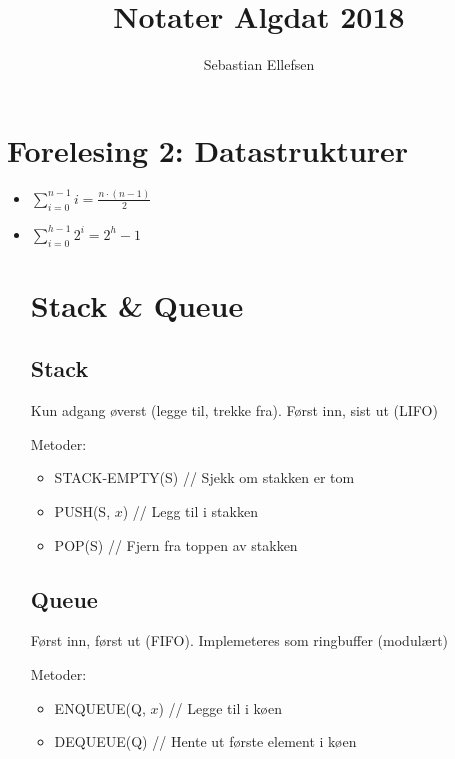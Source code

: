 \documentclass{article}
\title{Notater Algdat 2018}
\author{Sebastian Ellefsen}
\begin{document}
	\maketitle
	
	\section{Forelesing 2: Datastrukturer}
	
		\begin{itemize}
			\item $\sum_{i=0}^{n-1}i = \frac{n \cdot (n-1)}{2}$
			\item $\sum_{i=0}^{h-1} 2^i = 2^h - 1$
			
			\section{Stack \& Queue}
				\subsection{Stack}
					Kun adgang øverst (legge til, trekke fra).
					Først inn, sist ut (LIFO)
					
					Metoder: 
					\begin{itemize}
						\item STACK-EMPTY(S) // Sjekk om stakken er tom
						\item PUSH(S, $x$) // Legg til i stakken
						\item POP(S) // Fjern fra toppen av stakken
					\end{itemize}
				\subsection{Queue}
					Først inn, først ut (FIFO).
					Implemeteres som ringbuffer (modulært)
					
					Metoder:
					\begin{itemize}
						\item ENQUEUE(Q, $x$) // Legge til i køen
						\item DEQUEUE(Q) // Hente ut første element i køen
					\end{itemize}
						
				
				

\end{itemize}
\end{document}
